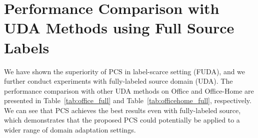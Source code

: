 \documentclass[final]{cvpr}
\begin{document}
\section{Performance Comparison with UDA Methods using Full Source Labels}

We have shown the superiority of PCS in label-scarce setting (FUDA), and we further conduct experiments with fully-labeled source domain (UDA). The performance comparison with other UDA methods on Office and Office-Home are presented in Table~\ref{tab:office_full} and Table~\ref{tab:officehome_full}, respectively. We can see that PCS achieves the best results even with fully-labeled source, which demonstrates that the proposed PCS could potentially be applied to a wider range of domain adaptation settings. 


 
\end{document}
